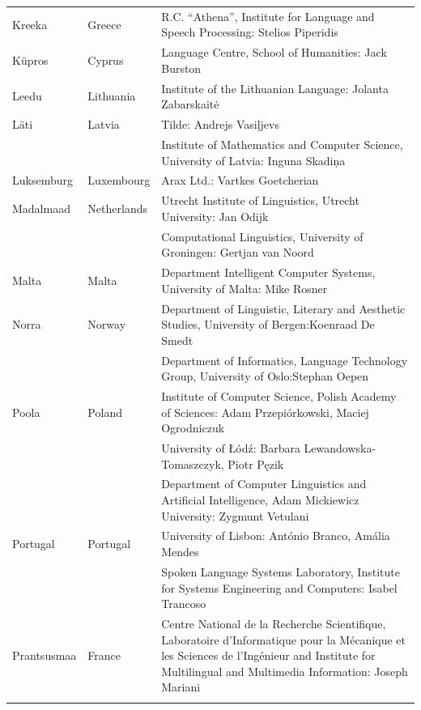 \begin{longtable}{@{}llp{113mm}@{}}
  Kreeka & \textcolor{grey1}{Greece} & R.C. “Athena”, Institute for Language and Speech Processing: Stelios Piperidis\\ \addlinespace
  Küpros & \textcolor{grey1}{Cyprus} & Language Centre, School of Humanities: Jack Burston\\ \addlinespace
  Leedu & \textcolor{grey1}{Lithuania} & Institute of the Lithuanian Language: Jolanta Zabarskaitė\\ \addlinespace
  Läti & \textcolor{grey1}{Latvia} & Tilde: Andrejs Vasiļjevs\\ \addlinespace 
  & & Institute of Mathematics and Computer Science, University of Latvia: Inguna Skadiņa\\ \addlinespace
  Luksemburg & \textcolor{grey1}{Luxembourg} & Arax Ltd.: Vartkes Goetcherian\\ \addlinespace
  Madalmaad & \textcolor{grey1}{Netherlands} & Utrecht Institute of Linguistics, Utrecht University: Jan Odijk\\ \addlinespace 
  & & Computational Linguistics, University of Groningen: Gertjan van Noord\\ \addlinespace
  Malta & \textcolor{grey1}{Malta} & Department Intelligent Computer Systems, University of Malta: Mike Rosner\\ \addlinespace
  Norra & \textcolor{grey1}{Norway} & Department of Linguistic, Literary and Aesthetic Studies, University of Bergen:\newline Koenraad De Smedt\\ \addlinespace 
  & & Department of Informatics, Language Technology Group, University of Oslo:\newline Stephan Oepen \\ \addlinespace
  Poola & \textcolor{grey1}{Poland} & Institute of Computer Science, Polish Academy of Sciences: Adam Przepiórkowski, Maciej Ogrodniczuk \\ \addlinespace
  & & University of Łódź: Barbara Lewandowska-Tomaszczyk, Piotr Pęzik\\ \addlinespace
  & & Department of Computer Linguistics and Artificial Intelligence, Adam Mickiewicz University: Zygmunt Vetulani \\ \addlinespace
  Portugal & \textcolor{grey1}{Portugal} & University of Lisbon: António Branco, Amália Mendes \\ \addlinespace
  & & Spoken Language Systems Laboratory, Institute for Systems Engineering and Computers: Isabel Trancoso \\ \addlinespace
Prantsusmaa & \textcolor{grey1}{France} & Centre National de la Recherche Scientifique, Laboratoire d'Informatique pour la Mécanique et les Sciences de l'Ingénieur and Institute for Multilingual and Multimedia Information: Joseph Mariani \\ \addlinespace

\end{longtable}
